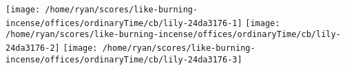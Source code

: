 \texttt{[image: /home/ryan/scores/like-burning-incense/offices/ordinaryTime/cb/lily-24da3176-1]}%
\ifx\betweenLilyPondSystem \undefined
  \linebreak
\else
  \expandafter{}%
\fi
\texttt{[image: /home/ryan/scores/like-burning-incense/offices/ordinaryTime/cb/lily-24da3176-2]}%
\ifx\betweenLilyPondSystem \undefined
  \linebreak
\else
  \expandafter{}%
\fi
\texttt{[image: /home/ryan/scores/like-burning-incense/offices/ordinaryTime/cb/lily-24da3176-3]}%
